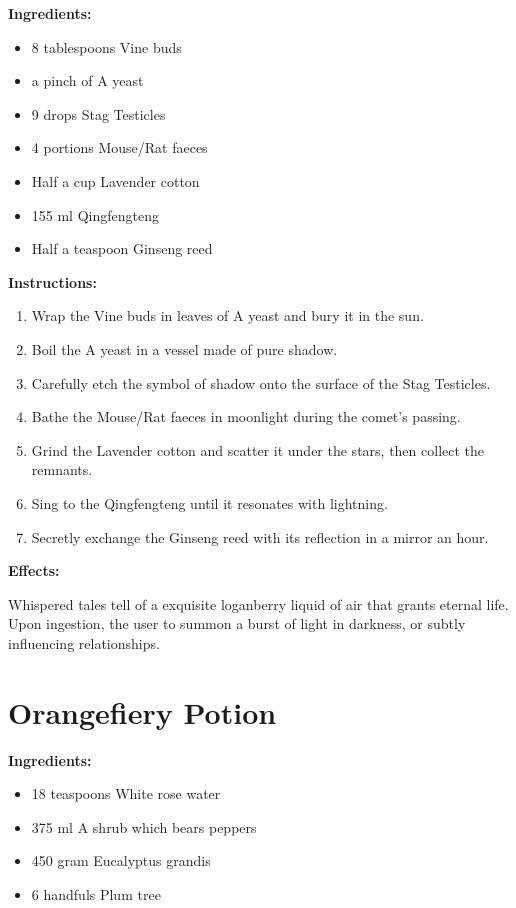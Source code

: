 \documentclass{article}
\begin{document}
\textbf{Ingredients:}

\begin{itemize}
  \item 8 tablespoons Vine buds
  \item a pinch of A yeast
  \item 9 drops Stag Testicles
  \item 4 portions Mouse/Rat faeces
  \item Half a cup Lavender cotton
  \item 155 ml Qingfengteng
  \item Half a teaspoon Ginseng reed
\end{itemize}

\textbf{Instructions:}

\begin{enumerate}
  \item Wrap the Vine buds in leaves of A yeast and bury it in the sun.
  \item Boil the A yeast in a vessel made of pure shadow.
  \item Carefully etch the symbol of shadow onto the surface of the Stag Testicles.
  \item Bathe the Mouse/Rat faeces in moonlight during the comet’s passing.
  \item Grind the Lavender cotton and scatter it under the stars, then collect the remnants.
  \item Sing to the Qingfengteng until it resonates with lightning.
  \item Secretly exchange the Ginseng reed with its reflection in a mirror an hour.
\end{enumerate}

\textbf{Effects:}

Whispered tales tell of a exquisite loganberry liquid of air that grants eternal life. Upon ingestion, the user to summon a burst of light in darkness, or subtly influencing relationships.

\newpage
\section*{Orangefiery Potion}

\textbf{Ingredients:}

\begin{itemize}
  \item 18 teaspoons White rose water
  \item 375 ml A shrub which bears peppers
  \item 450 gram Eucalyptus grandis
  \item 6 handfuls Plum tree
\end{itemize}
\end{document}
